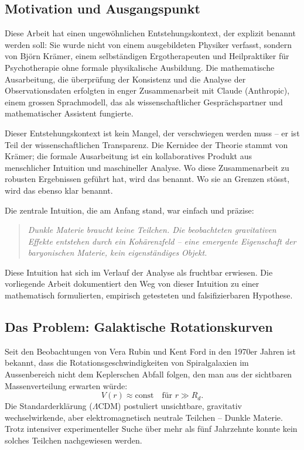 \documentclass[12pt,a4paper]{article}
\theoremstyle{definition}
\begin{document}
\subsection{Motivation und Ausgangspunkt}

Diese Arbeit hat einen ungewöhnlichen Entstehungskontext, der explizit
benannt werden soll: Sie wurde nicht von einem ausgebildeten Physiker
verfasst, sondern von Björn Krämer, einem selbständigen Ergotherapeuten
und Heilpraktiker für Psychotherapie ohne formale physikalische Ausbildung.
Die mathematische Ausarbeitung, die überprüfung der Konsistenz und die
Analyse der Observationsdaten erfolgten in enger Zusammenarbeit mit
Claude (Anthropic), einem grossen Sprachmodell, das als wissenschaftlicher
Gesprächspartner und mathematischer Assistent fungierte.

Dieser Entstehungskontext ist kein Mangel, der verschwiegen werden muss --
er ist Teil der wissenschaftlichen Transparenz. Die Kernidee der Theorie
stammt von Krämer; die formale Ausarbeitung ist ein kollaboratives Produkt
aus menschlicher Intuition und maschineller Analyse. Wo diese Zusammenarbeit
zu robusten Ergebnissen geführt hat, wird das benannt. Wo sie an Grenzen
stösst, wird das ebenso klar benannt.

Die zentrale Intuition, die am Anfang stand, war einfach und präzise:
\begin{quote}
\textit{Dunkle Materie braucht keine Teilchen. Die beobachteten gravitativen
Effekte entstehen durch ein Kohärenzfeld -- eine emergente Eigenschaft der
baryonischen Materie, kein eigenständiges Objekt.}
\end{quote}

Diese Intuition hat sich im Verlauf der Analyse als fruchtbar erwiesen.
Die vorliegende Arbeit dokumentiert den Weg von dieser Intuition zu einer
mathematisch formulierten, empirisch getesteten und falsifizierbaren Hypothese.

\subsection{Das Problem: Galaktische Rotationskurven}

Seit den Beobachtungen von Vera Rubin und Kent Ford in den 1970er Jahren
ist bekannt, dass die Rotationsgeschwindigkeiten von Spiralgalaxien im
Aussenbereich nicht dem Keplerschen Abfall folgen, den man aus der
sichtbaren Massenverteilung erwarten würde:
\begin{equation}
V(r) \approx \mathrm{const} \quad \text{für } r \gg R_d.
\end{equation}
Die Standarderklärung ($\Lambda$CDM) postuliert unsichtbare, gravitativ
wechselwirkende, aber elektromagnetisch neutrale Teilchen -- Dunkle Materie.
Trotz intensiver experimenteller Suche über mehr als fünf Jahrzehnte
konnte kein solches Teilchen nachgewiesen werden.
\end{document}
